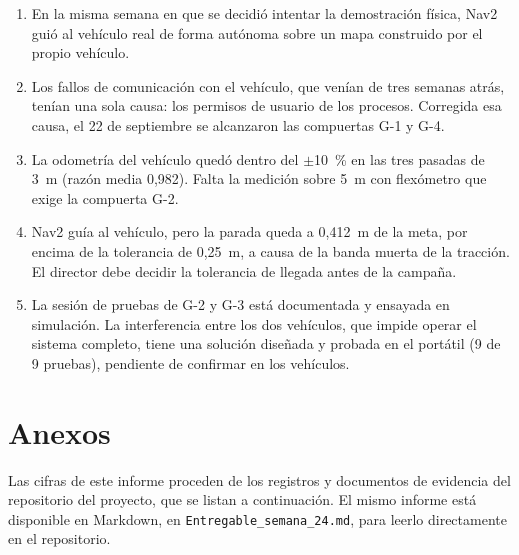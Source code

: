 \documentclass[12pt,letterpaper]{article}
\begin{document}
\begin{enumerate}[leftmargin=*]
    \item En la misma semana en que se decidió intentar la demostración física, Nav2 guió al vehículo real de forma autónoma sobre un mapa construido por el propio vehículo.
    \item Los fallos de comunicación con el vehículo, que venían de tres semanas atrás, tenían una sola causa: los permisos de usuario de los procesos. Corregida esa causa, el 22 de septiembre se alcanzaron las compuertas G-1 y G-4.
    \item La odometría del vehículo quedó dentro del $\pm$10~\% en las tres pasadas de 3~m (razón media 0,982). Falta la medición sobre 5~m con flexómetro que exige la compuerta G-2.
    \item Nav2 guía al vehículo, pero la parada queda a 0,412~m de la meta, por encima de la tolerancia de 0,25~m, a causa de la banda muerta de la tracción. El director debe decidir la tolerancia de llegada antes de la campaña.
    \item La sesión de pruebas de G-2 y G-3 está documentada y ensayada en simulación. La interferencia entre los dos vehículos, que impide operar el sistema completo, tiene una solución diseñada y probada en el portátil (9 de 9 pruebas), pendiente de confirmar en los vehículos.
\end{enumerate}

\section{Anexos}

Las cifras de este informe proceden de los registros y documentos de evidencia del repositorio del proyecto, que se listan a continuación. El mismo informe está disponible en Markdown, en \texttt{Entregable\_semana\_24.md}, para leerlo directamente en el repositorio.
\end{document}
